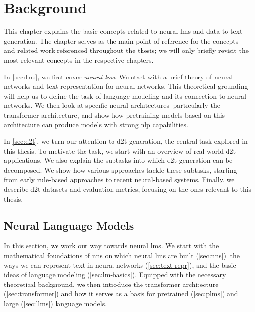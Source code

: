 
\chapter{Background}
\label{chap:background}

This chapter explains the basic concepts related to neural \acp{lm} and data-to-text generation. The chapter serves as the main point of reference for the concepts and related work referenced throughout the thesis; we will only briefly revisit the most relevant concepts in the respective chapters.

In \autoref{sec:lms}, we first cover \emph{neural \acp{lm}}. We start with a brief theory of neural networks and text representation for neural networks. This theoretical grounding will help us to define the task of language modeling and its connection to neural networks. We then look at specific neural architectures, particularly the transformer architecture, and show how pretraining models based on this architecture can produce models with strong \ac{nlp} capabilities.

In \autoref{sec:d2t}, we turn our attention to \ac{d2t} generation, the central task explored in this thesis. To motivate the task, we start with an overview of real-world \ac{d2t} applications. We also explain the subtasks into which \ac{d2t} generation can be decomposed. We show how various approaches tackle these subtasks, starting from early rule-based approaches to recent neural-based systems. Finally, we describe \ac{d2t} datasets and evaluation metrics, focusing on the ones relevant to this thesis.







\section{Neural Language Models}
\label{sec:lms}
In this section, we work our way towards neural \acp{lm}. We start with the mathematical foundations of \acp{nn} on which neural \acp{lm} are built (\autoref{sec:nns}), the ways we can represent text in neural networks (\autoref{sec:text-repr}), and the basic ideas of language modeling (\autoref{sec:lm-basics}). Equipped with the necessary theoretical background, we then introduce the transformer architecture (\autoref{sec:transformer}) and how it serves as a basis for pretrained (\autoref{sec:plms}) and large (\autoref{sec:llms}) language models.

